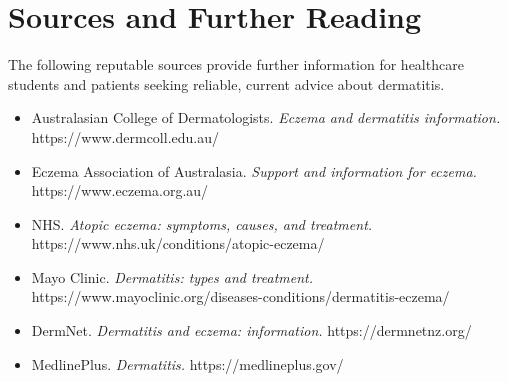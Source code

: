 \section*{Sources and Further Reading}
The following reputable sources provide further information for healthcare students and patients seeking reliable, current advice about dermatitis.

\begin{itemize}
    \item Australasian College of Dermatologists. \textit{Eczema and dermatitis information.} https://www.dermcoll.edu.au/
    \item Eczema Association of Australasia. \textit{Support and information for eczema.} https://www.eczema.org.au/
    \item NHS. \textit{Atopic eczema: symptoms, causes, and treatment.} https://www.nhs.uk/conditions/atopic-eczema/
    \item Mayo Clinic. \textit{Dermatitis: types and treatment.} https://www.mayoclinic.org/diseases-conditions/dermatitis-eczema/
    \item DermNet. \textit{Dermatitis and eczema: information.} https://dermnetnz.org/
    \item MedlinePlus. \textit{Dermatitis.} https://medlineplus.gov/
\end{itemize}
